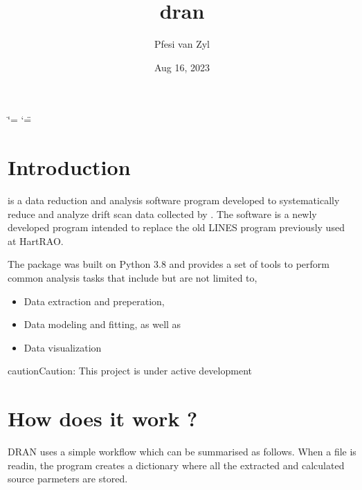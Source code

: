 \documentclass[letterpaper,10pt,english]{sphinxmanual}
\title{dran}
\date{Aug 16, 2023}
\author{Pfesi van Zyl}
\begin{document}
\ifdefined\shorthandoff
  \ifnum\catcode`\=\string=\active\shorthandoff{=}\fi
  \ifnum\catcode`\"=\active{}\fi
\fi

\pagestyle{empty}
\sphinxmaketitle
\pagestyle{plain}
\sphinxtableofcontents
\pagestyle{normal}
\label{\detokenize{index::doc}}



\chapter{Introduction}
\label{\detokenize{index:introduction}}
\sphinxAtStartPar
{} is a data reduction and analysis software program developed to systematically reduce and analyze
 drift scan data collected
by .
The software is a newly developed program intended to replace the old LINES program previously used at HartRAO.

\sphinxAtStartPar
The package was built on Python 3.8 and provides
a set of tools to perform common analysis tasks that
include but are not limited to,
\begin{itemize}
\item {} 
\sphinxAtStartPar
Data extraction and preperation,

\item {} 
\sphinxAtStartPar
Data modeling and fitting, as well as

\item {} 
\sphinxAtStartPar
Data visualization

\end{itemize}

\begin{sphinxadmonition}{caution}{Caution:}
\sphinxAtStartPar
This project is under active development
\end{sphinxadmonition}


\chapter{How does it work ?}
\label{\detokenize{index:how-does-it-work}}
\sphinxAtStartPar
DRAN uses a simple workflow which can be summarised as follows.
When a file is read\sphinxhyphen{}in, the program creates a dictionary where
all the extracted and calculated source parmeters are stored.
\end{document}
